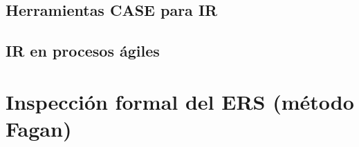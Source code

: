 \documentclass[journal,onecolumn]{IEEEtran}
\newcommand{\guia}[2]{%
	\begin{mdframed}[style=guia]
		\sloppy
		\noindent\textbf{Responsable: #1}\\[2pt]
		#2
	\end{mdframed}
}
\newif\ifguias
\let\guiaoriginal\guia
\renewcommand{\guia}[2]{\ifguias\guiaoriginal{#1}{#2}\fi}
\begin{document}
	\subsection{Herramientas CASE para IR}
	
	\guia{Jonathan (Integrante 3)}{%
		Extensión sugerida: 1,5 páginas. Contenido mínimo: clasificación de herramientas CASE
		(\emph{upper}, \emph{lower}, \emph{integrated}); funcionalidades esperables en gestión de
		requisitos --- repositorio, atributos, trazabilidad, \emph{baselining}, control de cambios,
		colaboración e integración con VCS; criterios de selección; limitaciones y costos.\\[3pt]
		Esta subsección debe \textbf{preparar} el cuadro comparativo de la sección 9: los criterios
		que se definan aquí son exactamente los que después se aplican allí. No copiar descripciones
		de sitios comerciales.}
	
	\subsection{IR en procesos ágiles}
	
	\guia{Kevin (Integrante 2)}{%
		Extensión sugerida: 1,5 páginas. Contenido mínimo: product backlog, historias de usuario y
		criterios de aceptación \cite{cohn2004}; \emph{grooming} y Definition of Ready/Done;
		BDD y formato Gherkin \cite{smart2014}; trazabilidad en entornos ágiles; contraste explícito
		con la IR documental y discusión de en qué contextos conviene cada enfoque.\\[3pt]
		Incluir al menos un ejemplo en formato Gherkin construido sobre un requisito real de
		MundiPets. El ERS ya trae criterios de aceptación en Gherkin en las HU-01 a HU-15: tomar uno
		de ahí en lugar de inventar un ejemplo de manual.}
	
	\section{Inspección formal del ERS (método Fagan)}
	
	\guia{Todo el equipo -- sección de mayor peso (20\,\%)}{%
		Esta sección se construye con la sesión \textbf{ya ejecutada}. Mínimos obligatorios:
		$\geq 6$ defectos por inspector en la preparación individual, con marca temporal verificable
		anterior a la reunión, y $\geq 15$ defectos únicos consolidados, de los cuales $\geq 3$
		críticos o mayores. Defectos sin correspondencia con el ERS son indicador~S3 (75\,\%).}
	
\end{document}
